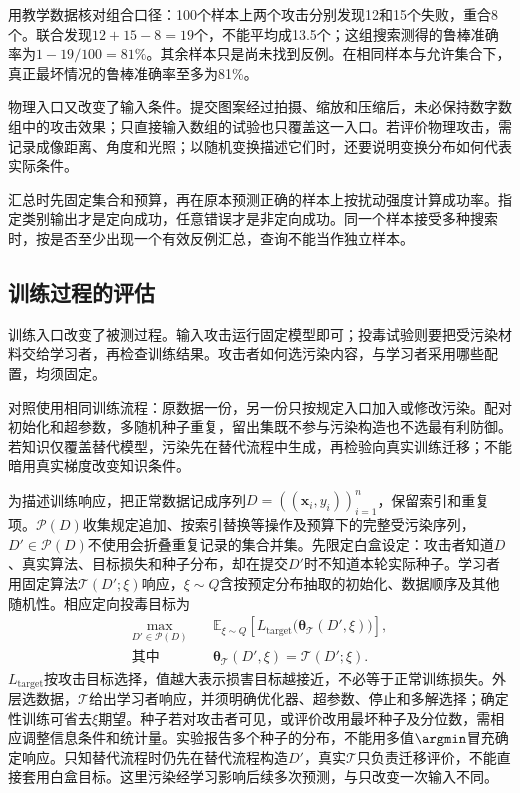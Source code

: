 用教学数据核对组合口径：100个样本上两个攻击分别发现12和15个失败，重合8个。联合发现$12+15-8=19$个，不能平均成13.5个；这组搜索测得的鲁棒准确率为$1-19/100=81\%$。其余样本只是尚未找到反例。在相同样本与允许集合下，真正最坏情况的鲁棒准确率至多为81\%。

物理入口又改变了输入条件。提交图案经过拍摄、缩放和压缩后，未必保持数字数组中的攻击效果；只直接输入数组的试验也只覆盖这一入口。若评价物理攻击，需记录成像距离、角度和光照；以随机变换描述它们时，还要说明变换分布如何代表实际条件。

汇总时先固定集合和预算，再在原本预测正确的样本上按扰动强度计算成功率。指定类别输出才是定向成功，任意错误才是非定向成功。同一个样本接受多种搜索时，按是否至少出现一个有效反例汇总，查询不能当作独立样本。

\subsection{训练过程的评估}
\label{sec:security-training-test}

训练入口改变了被测过程。输入攻击运行固定模型即可；投毒试验则要把受污染材料交给学习者，再检查训练结果。攻击者如何选污染内容，与学习者采用哪些配置，均须固定。

对照使用相同训练流程：原数据一份，另一份只按规定入口加入或修改污染。配对初始化和超参数，多随机种子重复，留出集既不参与污染构造也不选最有利防御。若知识仅覆盖替代模型，污染先在替代流程中生成，再检验向真实训练迁移；不能暗用真实梯度改变知识条件。

为描述训练响应，把正常数据记成序列$D=((\bm{x}_i,y_i))_{i=1}^{n}$，保留索引和重复项。$\mathcal P(D)$收集规定追加、按索引替换等操作及预算下的完整受污染序列，$D'\in\mathcal P(D)$不使用会折叠重复记录的集合并集。先限定白盒设定：攻击者知道$D$、真实算法、目标损失和种子分布，却在提交$D'$时不知道本轮实际种子。学习者用固定算法$\mathcal T(D';\xi)$响应，$\xi\sim Q$含按预定分布抽取的初始化、数据顺序及其他随机性。相应定向投毒目标为
\begin{equation}
 \begin{aligned}
 \max_{D'\in\mathcal P(D)}\quad&
 \mathbb E_{\xi\sim Q}
 \left[L_{\mathrm{target}}\bigl(\bm{\theta}_{\mathcal T}
       (D',\xi)\bigr)\right],\\
 \text{其中}\quad&
 \bm{\theta}_{\mathcal T}(D',\xi)
 =\mathcal T(D';\xi).
 \end{aligned}
 \label{eq:security-poison-bilevel}
\end{equation}
$L_{\mathrm{target}}$按攻击目标选择，值越大表示损害目标越接近，不必等于正常训练损失。外层选数据，$\mathcal T$给出学习者响应，并须明确优化器、超参数、停止和多解选择；确定性训练可省去$\xi$期望。种子若对攻击者可见，或评价改用最坏种子及分位数，需相应调整信息条件和统计量。实验报告多个种子的分布，不能用多值$\argmin$冒充确定响应。只知替代流程时仍先在替代流程构造$D'$，真实$\mathcal T$只负责迁移评价，不能直接套用白盒目标。这里污染经学习影响后续多次预测，与只改变一次输入不同。

